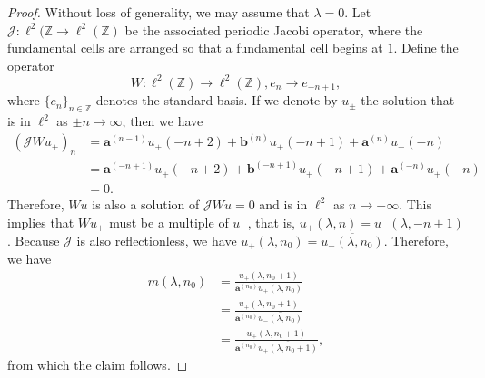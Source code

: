 \documentclass[a4paper,reqno,twoside]{amsart}
\numberwithin{equation}{section}
\theoremstyle{definition}
\newcommand{\bseq}[2]{{\bm{#1}^{(#2)}}}
\newcommand{\<}{\ensuremath \leq}
\renewcommand{\>}{\ensuremath \geq}
\renewcommand{\epsilon}{\varepsilon}
\begin{document}
\begin{proof}
    Without loss of generality, we may assume that $\lambda = 0$. Let $\mathcal{J}: \ell^2(\mathbb{Z}\rightarrow \ell^2(\mathbb{Z})$ be the associated periodic Jacobi operator, where the fundamental cells are arranged so that a fundamental cell begins at $1$. Define the operator $$W:\ell^2(\mathbb{Z})\rightarrow\ell^2(\mathbb{Z}), e_{n}\rightarrow e_{-n+1},$$ where $\{e_n\}_{n\in \mathbb{Z}}$ denotes the standard basis.  If we denote by $u_\pm$ the solution that is in $\ell^2$ as $\pm n\rightarrow \infty$, then we have
    \begin{equation}
        \begin{aligned}
            (\mathcal{J}Wu_+)_n&=\bseq{a}{n-1}u_+(-n+2) + \bseq{b}{n}u_+(-n+1) + \bseq{a}{n}u_+(-n)\\
            &=\bseq{a}{-n+1}u_+(-n+2) + \bseq{b}{-n+1}u_+(-n+1) + \bseq{a}{-n}u_+(-n)\\
            &=0.
        \end{aligned}
    \end{equation}
    Therefore, $Wu$ is also a solution of $\mathcal{J}Wu=0$ and is in $\ell^2$ as $n\rightarrow-\infty$. This implies that $Wu_+$ must be a multiple of $u_-$, that is, $u_+(\lambda,n) = u_-(\lambda,-n+1)$. Because $\mathcal{J}$ is also reflectionless, we have $u_+(\lambda,n_0) = \overline{u_-(\lambda, n_0)}$. Therefore, we have
    \begin{equation}
        \begin{aligned}
            m(\lambda,n_0) &= \frac{u_+(\lambda, n_0+1)}{\bseq{a}{n_0}u_+(\lambda, n_0)}\\
            &=\frac{u_+(\lambda, n_0+1)}{\bseq{a}{n_0}\overline{u_-(\lambda, n_0)}}\\
            &=\frac{u_+(\lambda,n_0+1)}{\bseq{a}{n_0}\overline{u_+(\lambda,n_0+1)}},
        \end{aligned}
    \end{equation}
    from which the claim follows.
\end{proof}

    
\end{document}
